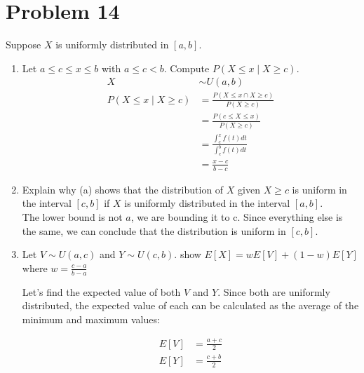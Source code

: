 \documentclass{article}
\begin{document}
\section*{Problem 14}
Suppose \(X\) is uniformly distributed in \([a, b]\).
\begin{enumerate}[label=\alph*)]
    \item Let \(a \leq c \leq x \leq b\) with \(a \leq c < b\). Compute \(P(X \leq x \mid X \geq c)\).
          \begin{align*}
              X                         & \sim U(a, b)                                    \\
              P(X \leq x \mid X \geq c) & = \frac{P(X \leq x \cap X \geq c)}{P(X \geq c)} \\
                                        & = \frac{P(c\leq X \leq x)}{P(X \geq c)}         \\
                                        & = \frac{\int_{c}^{x}f(t)dt}{\int_{c}^{b}f(t)dt} \\
                                        & = \frac{x - c}{b - c}
          \end{align*}
    \item Explain why (a) shows that the distribution of \(X\) given \(X \geq c\) is uniform in the interval \([c, b]\) if \(X\) is uniformly distributed in the interval \([a, b]\).\\
          The lower bound is not \(a\), we are bounding it to c. Since everything else is the same, we can conclude that the distribution is uniform in \([c, b]\).
    \item Let \(V \sim U(a, c)\) and \(Y \sim U(c, b)\). show \(E[X] = wE[V] + (1-w)E[Y]\) where \(w = \frac{c-a}{b-a}\)

          Let's find the expected value of both \(V\) and \(Y\). Since both are uniformly distributed, the expected value of each can be calculated as the average of the minimum and maximum values:

\begin{align*}
E[V] &= \frac{a + c}{2} \\
E[Y] &= \frac{c + b}{2}
\end{align*}


\end{enumerate}
\end{document}
